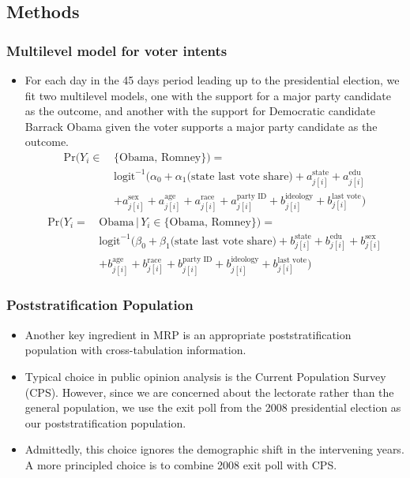 \documentclass[xetex,mathserif,serif]{beamer}
\begin{document}
\subsection{Methods}
\begin{frame}
  \frametitle{Multilevel model for voter intents}
  \begin{itemize}
  \item For each day in the 45 days period leading up to the presidential
    election, we fit two multilevel models, one with the support for a
    major party candidate as the outcome, and another with the support for
    Democratic candidate Barrack Obama given the voter supports a major party
    candidate as the outcome.
    \footnotesize{
      \begin{align*}
        \text{Pr}(Y_i \in \, &\{\text{Obama, Romney}\})=\\
        &\text{logit}^{-1}\big(\alpha_0+  \alpha_1\text{(state last vote share)} 
        + a^{\text{state}}_{j[i]}+a^{\text{edu}}_{j[i]}\\
        &+a^{\text{sex}}_{j[i]}+a^{\text{age}}_{j[i]}
        +a^{\text{race}}_{j[i]}+a^{\text{party ID}}_{j[i]}
        +b^{\text{ideology}}_{j[i]} + b^{\text{last vote}}_{j[i]} \big)
      \end{align*}
      \begin{align*}
        \text{Pr}(Y_i = \, &\text{Obama} \, |\, Y_i\in\{\text{Obama, Romney}\})=\\
        &\text{logit}^{-1}\big(\beta_0+ \beta_1\text{(state last vote share)} +
        b^{\text{state}}_{j[i]}+b^{\text{edu}}_{j[i]}+b^{\text{sex}}_{j[i]}\\
        &+b^{\text{age}}_{j[i]} +b^{\text{race}}_{j[i]}+b^{\text{party
            ID}}_{j[i]} + b^{\text{ideology}}_{j[i]} + b^{\text{last
            vote}}_{j[i]} \big)
      \end{align*}
    }
  \end{itemize}
\end{frame}
\begin{frame}
  \frametitle{Poststratification Population}
  \begin{itemize}
  \item Another key ingredient in MRP is an appropriate poststratification
    population with cross-tabulation information.
  \item Typical choice in public opinion analysis is the Current Population
    Survey (CPS). However, since we are concerned about the lectorate rather than
    the general population, we use the exit poll from the 2008 presidential
    election as our poststratification population.
  \item Admittedly, this choice ignores the demographic shift in the intervening
    years. A more principled choice is to combine 2008 exit poll with CPS.
  \end{itemize}
\end{frame}
\end{document}
